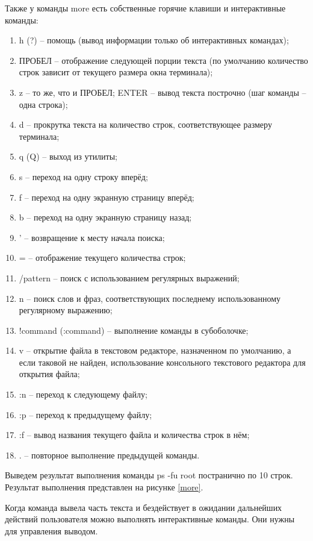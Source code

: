 Также у команды more есть собственные горячие клавиши и интерактивные команды:
\begin{enumerate}
    \item h (?) -- помощь (вывод информации только об интерактивных командах);
    \item ПРОБЕЛ -- отображение следующей порции текста (по умолчанию количество строк зависит от текущего размера окна терминала);
    \item z -- то же, что и ПРОБЕЛ;
    ENTER -- вывод текста построчно (шаг команды -- одна строка);
    \item d  -- прокрутка текста на количество строк, соответствующее размеру терминала;
    \item q (Q) -- выход из утилиты;
    \item s -- переход на одну строку вперёд;
    \item f -- переход на одну экранную страницу вперёд;
    \item b -- переход на одну экранную страницу назад;
    \item ' -- возвращение к месту начала поиска;
    \item = -- отображение текущего количества строк;
    \item /pattern -- поиск с использованием регулярных выражений;
    \item n -- поиск слов и фраз, соответствующих последнему использованному регулярному выражению;
    \item !command (:command) -- выполнение команды в субоболочке;
    \item v -- открытие файла в текстовом редакторе, назначенном по умолчанию, а если таковой не найден, использование консольного текстового редактора для открытия файла;
    \item :n -- переход к следующему файлу;
    \item :p -- переход к предыдущему файлу;
    \item :f -- вывод названия текущего файла и количества строк в нём;
    \item . -- повторное выполнение предыдущей команды.
\end{enumerate}

Выведем результат выполнения команды ps -fu root постранично по 10 строк. Результат выполнения представлен на рисунке \ref{more}.


Когда команда вывела часть текста и бездействует в ожидании дальнейших действий пользователя можно выполнять интерактивные команды. Они нужны для управления выводом.

